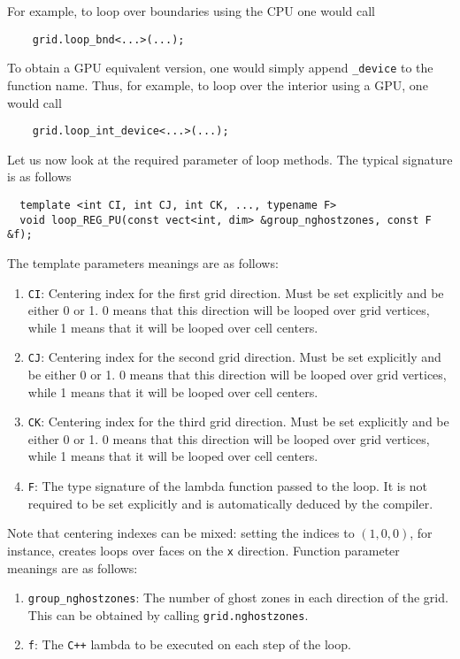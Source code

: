 For example, to loop over boundaries using the CPU one would call
%
\begin{lstlisting}
    grid.loop_bnd<...>(...);
\end{lstlisting}
%
To obtain a GPU equivalent version, one would simply append \texttt{\_device} to the function name. Thus, for example, to loop over the interior using a GPU, one would call 

\begin{lstlisting}
    grid.loop_int_device<...>(...);
\end{lstlisting}

Let us now look at the required parameter of loop methods. The typical signature is as follows

\begin{lstlisting}
  template <int CI, int CJ, int CK, ..., typename F>
  void loop_REG_PU(const vect<int, dim> &group_nghostzones, const F &f);
\end{lstlisting}

The template parameters meanings are as follows:

\begin{enumerate}
  \item \texttt{CI}: Centering index for the first grid direction. Must be set explicitly and be either 0 or 1. 0 means that this direction will be looped over grid vertices, while 1 means that it will be looped over cell centers.
  \item \texttt{CJ}: Centering index for the second grid direction. Must be set explicitly and be either 0 or 1. 0 means that this direction will be looped over grid vertices, while 1 means that it will be looped over cell centers.
  \item \texttt{CK}: Centering index for the third grid direction. Must be set explicitly and be either 0 or 1. 0 means that this direction will be looped over grid vertices, while 1 means that it will be looped over cell centers.
  \item \texttt{F}: The type signature of the lambda function passed to the loop. It is not required to be set explicitly and is automatically deduced by the compiler.
\end{enumerate}

Note that centering indexes can be mixed: setting the indices to $(1,0,0)$, for instance, creates loops over faces on the \texttt{x} direction. Function parameter meanings are as follows:

\begin{enumerate}
  \item \texttt{group\_nghostzones}: The number of ghost zones in each direction of the grid. This can be obtained by calling \texttt{grid.nghostzones}.
  \item \texttt{f}: The \texttt{C++} lambda to be executed on each step of the loop.
\end{enumerate}


